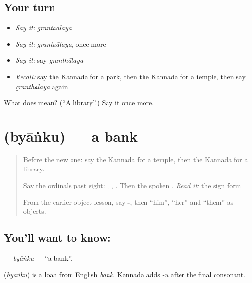 \subsection*{Your turn}
\begin{itemize}
\raggedright
  \item \emph{Say it:} \emph{granthālaya}
  \item \emph{Say it:} \emph{granthālaya}, once more
  \item \emph{Say it:} say \emph{granthālaya}
  \item \emph{Recall:} say the Kannada for a park, then the Kannada for a temple, then say \emph{granthālaya} again
\end{itemize}

\begin{tcolorbox}[breakable,colback=teal!4,colframe=teal!35!black,title={Before you move on}]
What does  mean? (\textquotedblleft{}A library\textquotedblright{}.) Say it once more.
\end{tcolorbox}
\section[\texorpdfstring{\kn{ಬ್ಯಾಂಕು} (byāṅku)}{ಬ್ಯಾಂಕು (byāṅku)}]{ (byāṅku) — a bank}

\label{lesson:KA-C109-byanku}



\begin{quote}
Before the new one: say the Kannada for a temple, then the Kannada for a library.

Say the ordinals past eight: \textbf{}, \textbf{}, \textbf{}. Then the spoken \textbf{}. \emph{Read it:} the sign form \textbf{}

From the earlier object lesson, say \textbf{-}, then “him”, “her” and “them” as objects.
\end{quote}

\subsection*{You'll want to know: }
\textbf{} — \emph{byāṅku} — \textquotedblleft{}a bank\textquotedblright{}.

\begin{cousinweb}
\textbf{} (\emph{byāṅku}) is a loan from English \emph{bank}. Kannada adds \emph{-u} after the final consonant.
\end{cousinweb}

